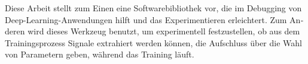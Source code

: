\begin{otherlanguage}{german}
    Diese Arbeit stellt zum Einen eine Softwarebibliothek vor, die im Debugging
    von Deep-Learning-Anwendungen hilft und das Experimentieren erleichtert. Zum
    Anderen wird dieses Werkzeug benutzt, um experimentell festzustellen, ob aus
    dem Trainingsprozess Signale extrahiert werden können, die Aufschluss über
    die Wahl von Parametern geben, während das Training läuft.

\end{otherlanguage}
